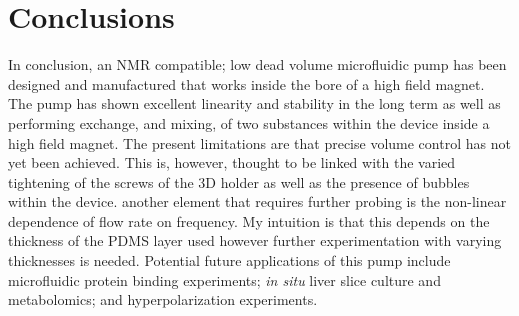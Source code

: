 \section{Conclusions}

In conclusion, an NMR compatible; low dead volume microfluidic pump has been designed and
manufactured that works inside the bore of a high field magnet. The pump has shown
excellent linearity and stability in the long term as well as performing exchange, and
mixing, of two substances within the device inside a high field magnet. The present limitations
are that precise volume control has not yet been achieved. This is, however, thought to be linked
with the varied tightening of the screws of the 3D holder as well as the presence of bubbles
within the device. another element that requires further probing is the non-linear dependence of
flow rate on frequency. My intuition is that this depends on the thickness of the PDMS layer used
however further experimentation with varying thicknesses is needed. Potential future applications
of this pump include microfluidic protein binding experiments; \textit{in situ} liver slice
culture and metabolomics; and hyperpolarization experiments.
